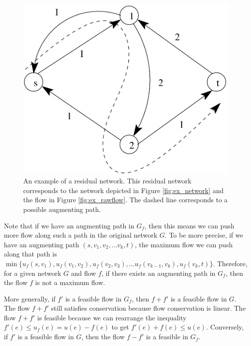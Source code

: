 \documentclass{article}
\begin{document}
\begin{figure}[h]
\begin{center}
\includegraphics{ex_residual.png}
\caption{An example of a residual network. This residual network
  corresponds to the network depicted in Figure \ref{fig:ex_network}
  and the flow in Figure \ref{fig:ex_rawflow}.  The dashed line
  corresponds to a possible augmenting path.}
\label{fig:ex_residual}
\end{center}
\end{figure}



Note that if we have an augmenting path in $G_f$, then this means we
can push more flow along such a path in the original network $G$.  
To be more precise, if we have an augmenting path $(s, v_1, v_2, \dots v_k,
t)$, the maximum flow we can push along that path is $\min\{u_f(s,
v_1), u_f(v_1, v_2), u_f(v_2, v_3), \dots u_f(v_{k-1}, v_k), u_f(v_{k},
t)\}$.   Therefore, for a given network $G$ and flow $f$, if there exists an
augmenting path in $G_f$, then the flow $f$ is not a maximum flow.  



More generally, if $f'$ is a feasible flow in $G_f$, then $f + f'$ is
a feasible flow in $G$.  The flow $f + f'$ still satisfies
conservation because flow conservation is linear.
The flow $f + f'$ is feasible because we can rearrange the inequality
$f'(e) \le u_f(e) = u(e) - f(e)$ to get $f'(e) + f(e) \le u(e)$.  
Conversely, if $f'$ is a feasible flow in $G$, then the flow $f - f'$ is a
feasible in $G_f$.
\end{document}
